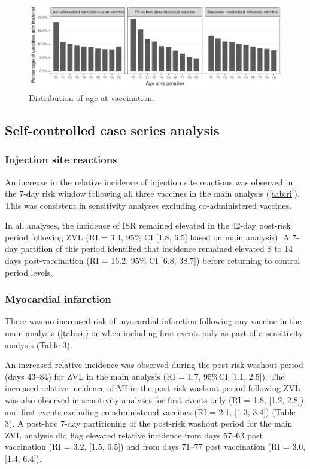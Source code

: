 \documentclass[review, endfloat]{elsarticle}
\begin{document}
\begin{figure}
\includegraphics{figs/age_at_exposure}
\caption{Distribution of age at vaccination.}
\label{fig:vax_ages}
\end{figure}


\subsection{Self-controlled case series analysis}





\subsubsection{Injection site reactions}

An increase in the relative incidence of injection site reactions was observed in the 7-day risk window following all three vaccines in the main analysis (\autoref{tab:ri}). This was consistent in sensitivity analyses excluding co-administered vaccines.

In all analyses, the incidence of ISR remained elevated in the 42-day post-risk period following ZVL (RI = 3.4, 95\% CI [1.8, 6.5] based on main analysis). A 7-day partition of this period identified that incidence remained elevated 8 to 14 days post-vaccination (RI = 16.2, 95\% CI [6.8, 38.7]) before returning to control period levels.

\subsubsection{Myocardial infarction}

There was no increased risk of myocardial infarction following any vaccine in the main analysis (\autoref{tab:ri}) or when including first events only as part of a sensitivity analysis (Table 3). 

An increased relative incidence was observed during the post-risk washout period (days 43–84) for ZVL in the main analysis (RI = 1.7, 95\%CI [1.1, 2.5]). The increased relative incidence of MI in the post-risk washout period following ZVL was also observed in sensitivity analyses for first events only (RI = 1.8, [1.2, 2.8]) and first events excluding co-administered vaccines (RI = 2.1, [1.3, 3.4]) (Table 3). A post-hoc 7-day partitioning of the post-risk washout period for the main ZVL analysis did flag elevated relative incidence from days 57–63 post vaccination (RI = 3.2, [1.5, 6.5]) and from days 71–77 post vaccination (RI = 3.0, [1.4, 6.4]).
\end{document}
